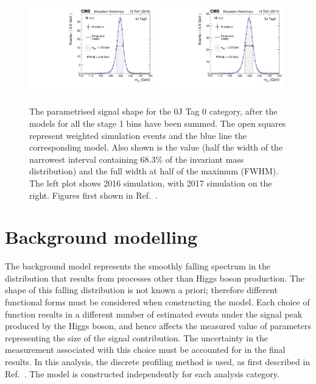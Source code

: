 \begin{figure}[hptb]
  \centering
  \includegraphics[width=0.49\textwidth]{Figures/SigBkg/RECO_0J_Tag0_2016.pdf}
  \includegraphics[width=0.49\textwidth]{Figures/SigBkg/RECO_0J_Tag0_2017.pdf}
  \caption[Signal model for the 0J Tag 0 category.]
  {
    The parametrised signal shape for the 0J Tag 0 category, 
    after the models for all the stage 1 bins have been summed.
    The open squares represent weighted simulation events and the blue line the
    corresponding model. Also shown is the \seff value (half the width of the narrowest interval
    containing 68.3\% of the invariant mass distribution) and the full width at half of the maximum
    (FWHM). The left plot shows 2016 simulation, with 2017 simulation on the right.
    Figures first shown in Ref.~\cite{HIG-18-029}.
  }
  \label{fig:sigbkg_cat}
\end{figure}

\section{Background modelling}

The background model represents the smoothly falling spectrum 
in the \mgg distribution that results from processes other than Higgs boson production.
The shape of this falling distribution is not known a priori;
therefore different functional forms must be considered when constructing the model.
Each choice of function results in a different number of estimated events 
under the signal peak produced by the Higgs boson, 
and hence affects the measured value of parameters representing the size of the signal contribution.
The uncertainty in the measurement associated with this choice must be accounted for 
in the final results.
In this analysis, the discrete profiling method is used, as first described in Ref.~\cite{Envelope}.
The model is constructed independently for each analysis category.

